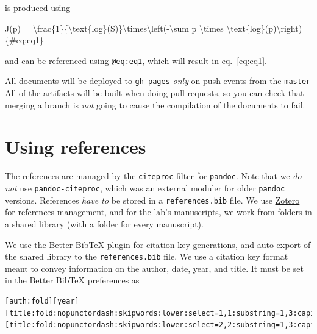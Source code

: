 \documentclass[12pt]{article}
\newenvironment{Shaded}{\begin{snugshade}}{\end{snugshade}}
\newcommand{\SpecialCharTok}[1]{\textcolor[rgb]{0.00,0.00,0.00}{#1}}
\newcommand{\SpecialStringTok}[1]{\textcolor[rgb]{0.31,0.60,0.02}{#1}}
\newcommand{\NormalTok}[1]{#1}
\begin{document}
is produced using

\begin{Shaded}
\begin{Highlighting}[]
\SpecialStringTok{$$J\textquotesingle{}(p) = }\SpecialCharTok{\textbackslash{}frac}\SpecialStringTok{\{1\}\{}\SpecialCharTok{\textbackslash{}text}\NormalTok{\{log\}}\SpecialStringTok{(S)\}}\SpecialCharTok{\textbackslash{}times\textbackslash{}left}\SpecialStringTok{({-}}\SpecialCharTok{\textbackslash{}sum}\SpecialStringTok{ p }\SpecialCharTok{\textbackslash{}times}\SpecialStringTok{ }\SpecialCharTok{\textbackslash{}text}\NormalTok{\{log\}}\SpecialStringTok{(p)}\SpecialCharTok{\textbackslash{}right}\SpecialStringTok{)$$}\NormalTok{ \{\#eq:eq1\}}
\end{Highlighting}
\end{Shaded}

and can be referenced using \texttt{@eq:eq1}, which will result in
eq.~\ref{eq:eq1}.

All documents will be deployed to \texttt{gh-pages} \emph{only} on push
events from the \texttt{master} All of the artifacts will be built when
doing pull requests, so you can check that merging a branch is
\emph{not} going to cause the compilation of the documents to fail.

\hypertarget{using-references}{%
\section{Using references}\label{using-references}}

The references are managed by the \texttt{citeproc} filter for
\texttt{pandoc}. Note that we \emph{do not} use
\texttt{pandoc-citeproc}, which was an external moduler for older
\texttt{pandoc} versions. References \emph{have to} be stored in a
\texttt{references.bib} file. We use
\href{https://www.zotero.org/}{Zotero} for references management, and
for the lab's manuscripts, we work from folders in a shared library
(with a folder for every manuscript).

We use the \href{https://retorque.re/zotero-better-bibtex/}{Better
BibTeX} plugin for citation key generations, and auto-export of the
shared library to the \texttt{references.bib} file. We use a citation
key format meant to convey information on the author, date, year, and
title. It must be set in the Better BibTeX preferences as

\begin{verbatim}
[auth:fold][year][title:fold:nopunctordash:skipwords:lower:select=1,1:substring=1,3:capitalize][title:fold:nopunctordash:skipwords:lower:select=2,2:substring=1,3:capitalize]
\end{verbatim}
\end{document}
